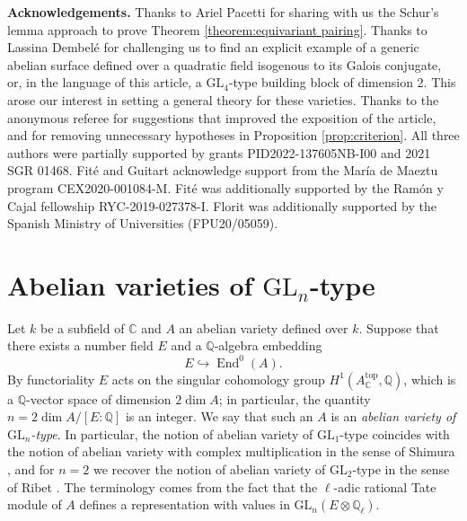 \documentclass[oneside]{amsart}
\theoremstyle{remark}
\newcommand{\Q}{\mathbb Q}
\newcommand{\C}{\mathbb C}
\newcommand{\GL}{\mathrm{GL}}
\newcommand{\End}{\operatorname{End}}
\numberwithin{equation}{section}
\begin{document}
\textbf{Acknowledgements.} Thanks to Ariel Pacetti for sharing with us the Schur's lemma approach to prove Theorem \ref{theorem:equivariant pairing}. Thanks to Lassina Dembelé for challenging us to find an explicit example of a generic abelian surface defined over a quadratic field isogenous to its Galois conjugate, or, in the language of this article, a $\GL_4$-type building block of dimension 2. This arose our interest in setting a general theory for these varieties. Thanks to the anonymous referee for suggestions that improved the exposition of the article, and for removing unnecessary hypotheses in Proposition \ref{prop:criterion}.  All three authors were partially supported by grants PID2022-137605NB-I00 and 2021 SGR 01468. Fité and Guitart acknowledge support from the María de Maeztu program CEX2020-001084-M. Fité was additionally
supported by the Ramón y Cajal fellowship RYC-2019-027378-I. Florit was additionally supported by the Spanish Ministry of Universities (FPU20/05059).




\section{Abelian varieties of $\GL_n$-type}\label{section: basic properties}

Let $k$ be a subfield of $\C$ and $A$ an abelian variety defined over $k$. Suppose that there exists a number field $E$ and a $\Q$-algebra embedding  
\begin{equation}\label{equation: inclusion}
E\hookrightarrow \End^0(A).
\end{equation}
By functoriality $E$ acts on the singular cohomology group $H^1(A_{\C}^{\mathrm{top}},\Q)$, which is a $\Q$-vector space of dimension $2\dim A$; in particular, the quantity $n = 2\dim A/[E\colon\Q]$ is an integer. We say that such an $A$ is an \emph{abelian variety of $\GL_n$-type}. In particular, the notion of abelian variety of $\GL_1$-type coincides with the notion of abelian variety with complex multiplication in the sense of Shimura \cite{Shi98}, and for $n=2$ we recover the notion of abelian variety of $\GL_2$-type in the sense of Ribet \cite{Rib92}. The terminology comes from the fact that the $\ell$-adic rational Tate module of $A$ defines a representation with values in $\GL_n(E\otimes \Q_\ell)$.
\end{document}
